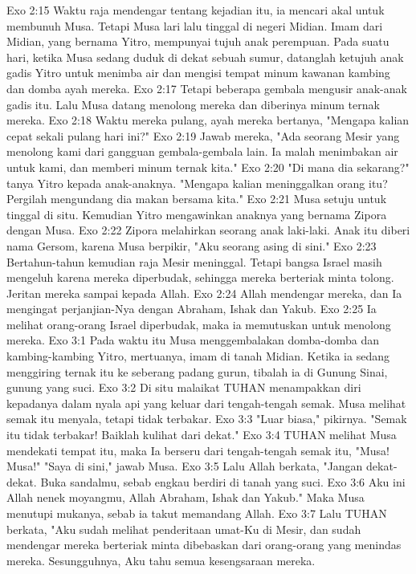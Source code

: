 Exo 2:15  Waktu raja mendengar tentang kejadian itu, ia mencari akal untuk membunuh Musa. Tetapi Musa lari lalu tinggal di negeri Midian. Imam dari Midian, yang bernama Yitro, mempunyai tujuh anak perempuan. Pada suatu hari, ketika Musa sedang duduk di dekat sebuah sumur, datanglah ketujuh anak gadis Yitro untuk menimba air dan mengisi tempat minum kawanan kambing dan domba ayah mereka.
Exo 2:17  Tetapi beberapa gembala mengusir anak-anak gadis itu. Lalu Musa datang menolong mereka dan diberinya minum ternak mereka.
Exo 2:18  Waktu mereka pulang, ayah mereka bertanya, "Mengapa kalian cepat sekali pulang hari ini?"
Exo 2:19  Jawab mereka, "Ada seorang Mesir yang menolong kami dari gangguan gembala-gembala lain. Ia malah menimbakan air untuk kami, dan memberi minum ternak kita."
Exo 2:20  "Di mana dia sekarang?" tanya Yitro kepada anak-anaknya. "Mengapa kalian meninggalkan orang itu? Pergilah mengundang dia makan bersama kita."
Exo 2:21  Musa setuju untuk tinggal di situ. Kemudian Yitro mengawinkan anaknya yang bernama Zipora dengan Musa.
Exo 2:22  Zipora melahirkan seorang anak laki-laki. Anak itu diberi nama Gersom, karena Musa berpikir, "Aku seorang asing di sini."
Exo 2:23  Bertahun-tahun kemudian raja Mesir meninggal. Tetapi bangsa Israel masih mengeluh karena mereka diperbudak, sehingga mereka berteriak minta tolong. Jeritan mereka sampai kepada Allah.
Exo 2:24  Allah mendengar mereka, dan Ia mengingat perjanjian-Nya dengan Abraham, Ishak dan Yakub.
Exo 2:25  Ia melihat orang-orang Israel diperbudak, maka ia memutuskan untuk menolong mereka.
Exo 3:1  Pada waktu itu Musa menggembalakan domba-domba dan kambing-kambing Yitro, mertuanya, imam di tanah Midian. Ketika ia sedang menggiring ternak itu ke seberang padang gurun, tibalah ia di Gunung Sinai, gunung yang suci.
Exo 3:2  Di situ malaikat TUHAN menampakkan diri kepadanya dalam nyala api yang keluar dari tengah-tengah semak. Musa melihat semak itu menyala, tetapi tidak terbakar.
Exo 3:3  "Luar biasa," pikirnya. "Semak itu tidak terbakar! Baiklah kulihat dari dekat."
Exo 3:4  TUHAN melihat Musa mendekati tempat itu, maka Ia berseru dari tengah-tengah semak itu, "Musa! Musa!" "Saya di sini," jawab Musa.
Exo 3:5  Lalu Allah berkata, "Jangan dekat-dekat. Buka sandalmu, sebab engkau berdiri di tanah yang suci.
Exo 3:6  Aku ini Allah nenek moyangmu, Allah Abraham, Ishak dan Yakub." Maka Musa menutupi mukanya, sebab ia takut memandang Allah.
Exo 3:7  Lalu TUHAN berkata, "Aku sudah melihat penderitaan umat-Ku di Mesir, dan sudah mendengar mereka berteriak minta dibebaskan dari orang-orang yang menindas mereka. Sesungguhnya, Aku tahu semua kesengsaraan mereka.
